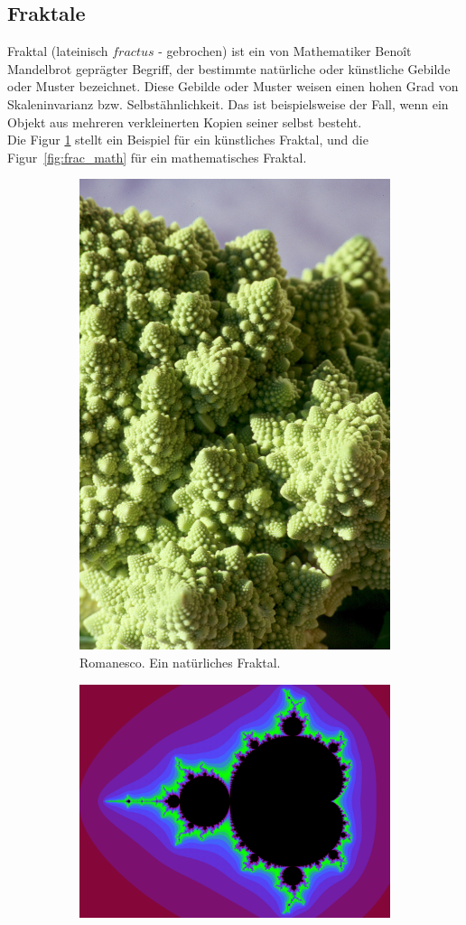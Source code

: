 \documentclass[a4paper,12pt]{llncs}
\numberwithin{equation}{section}
\begin{document}
\subsection{Fraktale}
Fraktal (lateinisch $fractus$ - gebrochen) ist ein von Mathematiker Benoît Mandelbrot geprägter Begriff, der bestimmte natürliche oder künstliche Gebilde oder Muster bezeichnet. 
Diese Gebilde oder Muster weisen einen hohen Grad von Skaleninvarianz bzw. Selbstähnlichkeit. 
Das ist beispielsweise der Fall, wenn ein Objekt aus mehreren verkleinerten Kopien seiner selbst besteht.~\cite{fraktal} \\
Die Figur \ref{fig:frac_kunst} stellt ein Beispiel für ein künstliches Fraktal, und die Figur~\ref{fig:frac_math} für ein mathematisches Fraktal.
\begin{figure}[ht]   
	\begin{subfigure}{.5\textwidth}
	\centering
	\includegraphics[width=.6\linewidth]{figures/Romanesco}
	\caption{Romanesco. Ein natürliches Fraktal.~\cite{fractal_romanesco}}
	\label{fig:frac_kunst}
\end{subfigure}%
\begin{subfigure}{.5\textwidth}
	\centering
	\includegraphics[width=.9\linewidth, angle =90 ]{figures/Mandelbrot}

\end{subfigure}
\end{figure}
\end{document}
